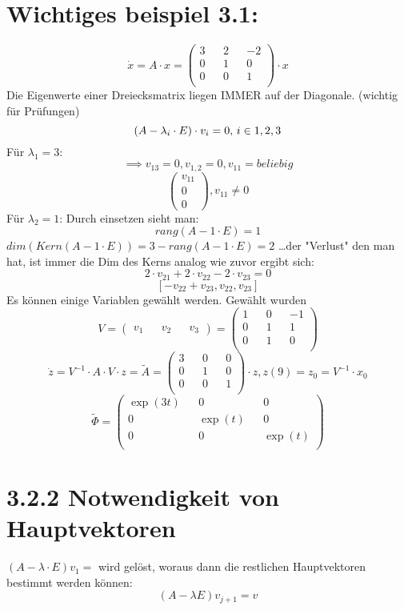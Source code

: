 \documentclass[a4paper]{article}
\begin{document}
\section*{Wichtiges beispiel 3.1:}
\[\dot x = A \cdot x = 
\begin{pmatrix}
3 && 2 && -2\\
0 && 1 && 0\\
0 && 0 && 1\\
\end{pmatrix}\cdot x\]
Die Eigenwerte einer Dreiecksmatrix liegen IMMER auf der Diagonale. (wichtig für Prüfungen)
\[(A-\lambda_{i}\cdot E)\cdot v_i=0$, $i \in {1,2,3}\]
Für $\lambda_1=3$:
\[\implies v_{13}=0, v_{1,2}=0, v_{11}=beliebig\]
\[\begin{pmatrix} v_{11}\\ 0\\ 0\end{pmatrix}, v_{11}\neq 0\]
Für $\lambda_2=1$:
Durch einsetzen sieht man:
\[rang(A-1\cdot E)=1\]
$dim(Kern(A-1\cdot E))=3-rang(A-1\cdot E)=2$  \ldots der "Verlust" den man hat, ist immer die Dim des Kerns
analog wie zuvor ergibt sich:
\[2\cdot v_{21}+2\cdot v_{22}-2\cdot v_{23}=0\]
\[[-v_{22}+v_{23}, v_{22}, v_{23}]\]
Es können einige Variablen gewählt werden. Gewählt wurden
\[V=\begin{pmatrix} v_{1}&& v_{2}&& v_{3}\end{pmatrix}=\begin{pmatrix}
1 && 0 && -1\\
0 && 1 && 1\\
0 && 1 && 0\\
\end{pmatrix}\]
\[\dot z =V^{-1}\cdot A\cdot V\cdot z=\tilde A=\begin{pmatrix}
3 && 0 && 0\\
0 && 1 && 0\\
0 && 0 && 1\\
\end{pmatrix}\cdot z, z(9)=z_0=V^{-1}\cdot x_0\]
\[\tilde \Phi=\begin{pmatrix}
\exp(3t) && 0 && 0\\
0 && \exp(t) && 0\\
0 && 0 && \exp(t)\\
\end{pmatrix}\]

\section*{3.2.2 Notwendigkeit von Hauptvektoren}
$(A-\lambda \cdot E)v_1=$ wird gelöst, woraus dann die restlichen Hauptvektoren bestimmt werden können:
\[(A-\lambda E)v_{j+1}=v\]
\end{document}
